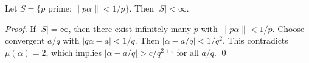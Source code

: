 \begin{corollary}
Let $S = \{p \text{ prime} : \|p\alpha\| < 1/p\}$. Then $|S| < \infty$.
\end{corollary}

\begin{proof}
If $|S| = \infty$, then there exist infinitely many $p$ with $\|p\alpha\| < 1/p$.
Choose convergent $a/q$ with $|q\alpha - a| < 1/q$. Then $|\alpha - a/q| < 1/q^2$.
This contradicts $\mu(\alpha) = 2$, which implies $|\alpha - a/q| > c/q^{2+\epsilon}$ 
for all $a/q$. \qed
\end{proof}
